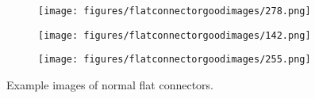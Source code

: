 \begin{figure}[htbp]
    \captionsetup[subfigure]{justification=centering}
    \centering
    \begin{subfigure}[b]{0.25\textwidth} %
        \centering
        \texttt{[image: figures/flatconnectorgoodimages/278.png]}
    \end{subfigure}
    \hspace{0.05\textwidth} %
    \begin{subfigure}[b]{0.25\textwidth} %
        \centering
        \texttt{[image: figures/flatconnectorgoodimages/142.png]}
    \end{subfigure}
    \hspace{0.05\textwidth} %
    \begin{subfigure}[b]{0.25\textwidth} %
        \centering
        \texttt{[image: figures/flatconnectorgoodimages/255.png]}
    \end{subfigure}
    \caption{Example images of normal flat connectors.}
    \label{fig:flatgoodimages}
\end{figure}
